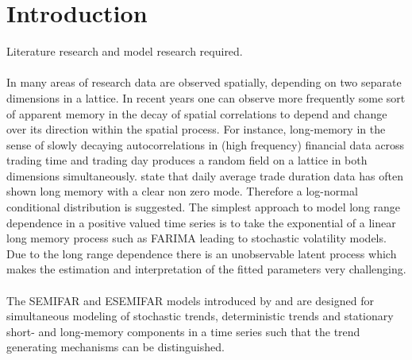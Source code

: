\documentclass[12pt]{article}
\begin{document}
\section{Introduction}
Literature research and model research required.\\
\\ 
In many areas of research data are observed spatially, depending on two separate dimensions in a lattice. 
In recent years one can observe more frequently some sort of apparent memory in the decay of spatial correlations to depend and change over its direction within the spatial process. 
For instance, long-memory in the sense of slowly decaying autocorrelations in (high frequency) financial data across trading time and trading day produces a random field on a lattice in both dimensions simultaneously. \textcite{beran2015modelling} state that daily average trade duration data has often shown long memory
with a clear non zero mode. Therefore a log-normal conditional distribution is suggested.
The simplest approach to model long range dependence in a positive valued
time series is to take the exponential of a linear long memory process such as
FARIMA leading to stochastic volatility models. Due to the long range dependence
there is an unobservable latent process which makes the estimation and interpretation
of the fitted parameters very challenging.\\
\\
The SEMIFAR and ESEMIFAR models introduced by \textcite{beran2002semifar} and \textcite{beran2015modelling} are designed for simultaneous modeling of stochastic trends, deterministic trends and stationary short- and long-memory components in a time series such that the trend generating mechanisms can be distinguished.
\end{document}
